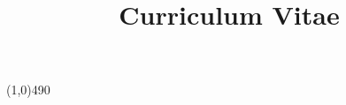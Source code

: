 \documentclass[11pt,a4paper,sans]{moderncv}
\title{Curriculum Vitae}
\begin{document}
\maketitle

\begin{center}
\line(1,0){490}
\end{center}

\nocite{*} 
 
 
\end{document}
